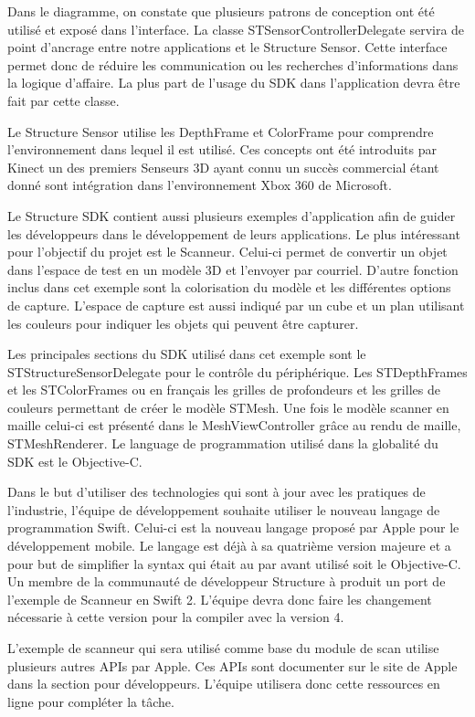 \documentclass[letterpaper,twoside,12pt,french]{report}
\begin{document}
Dans le diagramme, on constate que plusieurs patrons de conception ont été utilisé et exposé dans
l'interface. La classe STSensorControllerDelegate servira de point d'ancrage entre notre
applications et le Structure Sensor. Cette interface permet donc de réduire les communication ou 
les recherches d'informations dans la logique d'affaire. La plus part de l'usage du SDK dans
l'application devra être fait par cette classe. \citep*{bpse01}
\par
Le Structure Sensor utilise les DepthFrame et ColorFrame pour comprendre l'environnement dans lequel
il est utilisé. Ces concepts ont été introduits par Kinect un des premiers Senseurs 3D ayant connu
un succès commercial étant donné sont intégration dans l'environnement Xbox 360 de Microsoft.
\citep*{microsoft01}
\par
Le Structure SDK contient aussi plusieurs exemples d'application afin de guider les développeurs dans
le développement de leurs applications. Le plus intéressant pour l'objectif du projet est le
Scanneur. Celui-ci permet de convertir un objet dans l'espace de test en un modèle 3D et l'envoyer
par courriel. D'autre fonction inclus dans cet exemple sont la colorisation du modèle et les
différentes options de capture. L'espace de capture est aussi indiqué par un cube et un plan
utilisant les couleurs pour indiquer les objets qui peuvent être capturer.
\par
Les principales sections du SDK utilisé dans cet exemple sont le STStructureSensorDelegate pour le
contrôle du périphérique. Les STDepthFrames et les STColorFrames ou en français les grilles de
profondeurs et les grilles de couleurs permettant de créer le modèle STMesh. Une fois le modèle
scanner en maille celui-ci est présenté dans le MeshViewController grâce au rendu de maille,
STMeshRenderer. Le language de programmation utilisé dans la globalité du SDK est le Objective-C.
\par
Dans le but d'utiliser des technologies qui sont à jour avec les pratiques de l'industrie, l'équipe
de développement souhaite utiliser le nouveau langage de programmation Swift. Celui-ci est la
nouveau langage proposé par Apple pour le développement mobile. Le langage est déjà à sa quatrième
version majeure et a pour but de simplifier la syntax qui était au par avant utilisé soit le
Objective-C. \citep*{swift01} Un membre de la communauté de développeur Structure à produit un
port de l'exemple de Scanneur en Swift 2. L'équipe devra donc faire les changement nécessarie à
cette version pour la compiler avec la version 4. \citep*{structureScannerSwift}
\par
L'exemple de scanneur qui sera utilisé comme base du module de scan utilise plusieurs autres APIs
par Apple. Ces APIs sont documenter sur le site de Apple dans la section pour développeurs.
\citep*{appleDev} L'équipe utilisera donc cette ressources en ligne pour compléter la tâche.
\end{document}
